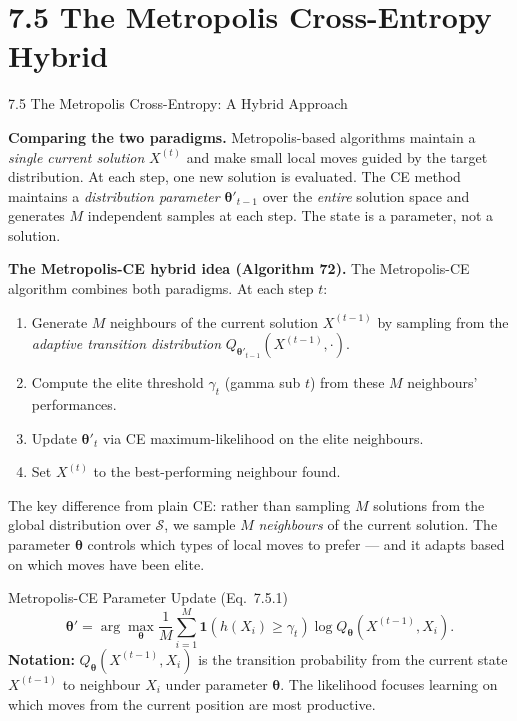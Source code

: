 \documentclass[aspectratio=169,10pt]{beamer}
\newcommand{\btheta}{\boldsymbol{\theta}}
\newcommand{\calS}{\mathcal{S}}
\begin{document}
\section{7.5 The Metropolis Cross-Entropy Hybrid}

\begin{frame}[allowframebreaks]{7.5 The Metropolis Cross-Entropy: A Hybrid Approach}

\textbf{Comparing the two paradigms.}
Metropolis-based algorithms maintain a \emph{single current solution}
$X^{(t)}$ and make small local moves guided by the target distribution.  At
each step, one new solution is evaluated.  The CE method maintains a
\emph{distribution parameter} $\btheta'_{t-1}$ over the \emph{entire}
solution space and generates $M$ independent samples at each step.  The
state is a parameter, not a solution.

\medskip
\textbf{The Metropolis-CE hybrid idea (Algorithm 72).}
The Metropolis-CE algorithm combines both paradigms.  At each step $t$:
\begin{enumerate}
  \item Generate $M$ neighbours of the current solution $X^{(t-1)}$ by
    sampling from the \emph{adaptive transition distribution}
    $Q_{\btheta'_{t-1}}(X^{(t-1)}, \cdot)$.
  \item Compute the elite threshold $\gamma_t$ (gamma sub $t$) from these
    $M$ neighbours' performances.
  \item Update $\btheta'_t$ via CE maximum-likelihood on the elite
    neighbours.
  \item Set $X^{(t)}$ to the best-performing neighbour found.
\end{enumerate}

The key difference from plain CE: rather than sampling $M$ solutions from
the global distribution over $\calS$, we sample $M$ \emph{neighbours} of
the current solution.  The parameter $\btheta$ controls which types of local
moves to prefer --- and it adapts based on which moves have been elite.

\begin{block}{Metropolis-CE Parameter Update (Eq.~7.5.1)}
  \[
    \btheta' = \arg\max_{\btheta} \frac{1}{M}
      \sum_{i=1}^M \mathbf{1}(h(X_i) \ge \gamma_t)
      \log Q_{\btheta}(X^{(t-1)}, X_i).
  \]
  \textbf{Notation:} $Q_{\btheta}(X^{(t-1)}, X_i)$ is the transition
  probability from the current state $X^{(t-1)}$ to neighbour $X_i$ under
  parameter $\btheta$.  The likelihood focuses learning on which moves from
  the current position are most productive.
\end{block}


\end{frame}
\end{document}
